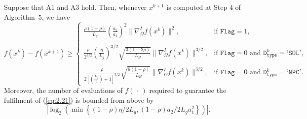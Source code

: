 \documentclass[10pt,a4paper]{amsart}
\begin{document}
\begin{lemma}
Suppose that A1 and A3 hold. Then, whenever $x^{k+1}$ is computed at Step 4 of Algorithm~5, we have
\small
\setlength{\arraycolsep}{3pt}
\begin{equation}
f(x^{k})-f(x^{k+1})\geq\left\{\begin{array}{ll}
\frac{\rho(1-\rho)}{L_{g}}\left(\frac{a_{2}}{a_{1}}\right)^{2}\|\nabla_{\Omega}^{I}f(x^{k})\|^{2},&\text{if $\texttt{Flag}=1$,}\\
& \\
\frac{\rho}{2^{5/2}}\left(\frac{\eta}{L_{g}}\right)^{3/2}\sqrt{\frac{3(1-2\rho)}{L_{H}}}\|\nabla_{\Omega}^{I}f(x^{k})\|^{3/2},&\text{if $\texttt{Flag}=0$ and $\texttt{D}_{\texttt{type}}^{k}=\texttt{`SOL'}$,}\\
&\\
\frac{\rho}{2\left[\left(\frac{L_{g}}{\eta}\right)+1\right]^{3/2}}\sqrt{\frac{6(1-\rho)}{L_{H}}}\|\nabla_{\Omega}^{I}f(x^{k})\|^{3/2},&\text{if $\texttt{Flag}=0$ and $\texttt{D}_{\texttt{type}}^{k}=\texttt{`NPC'}$.}
\end{array}
\right.
\label{eq:edg1}
\end{equation}
\normalsize
Moreover, the number of evaluations of $f(\,\cdot\,)$ required to guarantee the fulfilment of (\ref{eq:2.21}) is bounded from above by 
$$|\log_{2}\left(\min\left\{(1-\rho)\eta / 2L_{g},(1-\rho)a_{2} / 2L_{g}a_{1}^{2}\right\}\right)|.$$
\label{lem:edg1}
\end{lemma}
\end{document}
